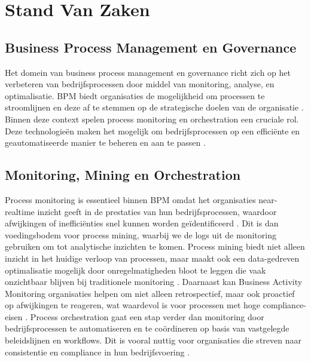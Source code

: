 
\section{Stand Van Zaken}%
\label{sec:stand_van_zaken}
\subsection{Business Process Management en Governance}

Het domein van business process management en governance richt zich op het verbeteren van bedrijfsprocessen door middel van monitoring, analyse, en optimalisatie. BPM biedt organisaties de mogelijkheid om processen te stroomlijnen en deze af te stemmen op de strategische doelen van de organisatie \autocite{Dumas2018}. Binnen deze context spelen process monitoring en orchestration een cruciale rol. Deze technologieën maken het mogelijk om bedrijfsprocessen op een efficiënte en geautomatiseerde manier te beheren en aan te passen \autocite{Weske2019}.

\subsection{Monitoring, Mining en Orchestration}

Process monitoring is essentieel binnen BPM omdat het organisaties near-realtime inzicht geeft in de prestaties van hun bedrijfsprocessen, waardoor afwijkingen of inefficiënties snel kunnen worden geïdentificeerd \autocite{Janiesch2012}. Dit is dan voedingsbodem voor process mining, waarbij we de logs uit de monitoring gebruiken om tot analytische inzichten te komen. Process mining biedt niet alleen inzicht in het huidige verloop van processen, maar maakt ook een data-gedreven optimalisatie mogelijk door onregelmatigheden bloot te leggen die vaak onzichtbaar blijven bij traditionele monitoring \autocite{Aalst2016}. Daarnaast kan Business Activity Monitoring organisaties helpen om niet alleen retrospectief, maar ook proactief op afwijkingen te reageren, wat waardevol is voor processen met hoge compliance-eisen \autocite{Janiesch2012}. Process orchestration gaat een stap verder dan monitoring door bedrijfsprocessen te automatiseren en te coördineren op basis van vastgelegde beleidslijnen en workflows. Dit is vooral nuttig voor organisaties die streven naar consistentie en compliance in hun bedrijfsvoering \autocite{Weske2019}. 

